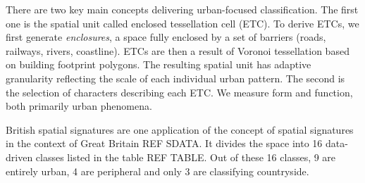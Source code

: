 There are two key main concepts delivering urban-focused classification. The first one is the spatial unit called enclosed tessellation cell (ETC). To derive ETCs, we first generate \textit{enclosures}, a space fully enclosed by a set of barriers (roads, railways, rivers, coastline). ETCs are then a result of Voronoi tessellation based on building footprint polygons. The resulting spatial unit has adaptive granularity reflecting the scale of each individual urban pattern. The second is the selection of characters describing each ETC. We measure form and function, both primarily urban phenomena.


British spatial signatures are one application of the concept of spatial signatures in the context of Great Britain REF SDATA. It divides the space into 16 data-driven classes listed in the table REF TABLE. Out of these 16 classes, 9 are entirely urban, 4 are peripheral and only 3 are classifying countryside.


